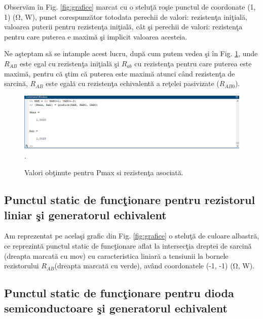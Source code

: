 \documentclass[multi=false, tikz, border=2mm]{article}
\newcommand\tab[1][0.6cm]{\hspace*{#1}}
\begin{document}
Observ\u{a}m \^{i}n Fig. \ref{fig:grafice} marcat cu o stelu\c{t}\u{a} ro\c{s}ie punctul de coordonate (1, 1) (\si{\ohm}, \si{\watt}), punct corespunz\u{a}tor totodata perechii de valori: rezisten\c{t}a ini\c{t}ial\u{a}, valoarea puterii pentru rezisten\c{t}a ini\c{t}ial\u{a}, c\^{a}t \c{s}i perechii de valori: rezisten\c{t}a pentru care puterea e maxim\u{a} \c{s}i implicit valoarea acesteia.

Ne a\c{s}teptam s\u{a} se intample acest lucru, dup\u{a} cum putem vedea \c{s}i \^{i}n Fig. \ref{fig:ValoriPR}, unde $R_{AB}$ este egal cu rezisten\c{t}a ini\c{t}ial\u{a} \c{s}i $R_{ab}$ cu rezisten\c{t}a pentru care puterea este maxim\u{a}, pentru c\u{a} \c{s}tim c\u{a} puterea este maxim\u{a} atunci c\^{a}nd rezisten\c{t}a de sarcin\u{a}, $R_{AB}$ este egal\u{a} cu rezisten\c{t}a echivalent\u{a} a re\c{t}elei pasivizate ($R_{AB0}$).

\begin{figure}[h!b]
	\begin{center}
		\hspace*{-3cm}
		\includegraphics[clip, width=180mm]{ValoriPutereRezistenta}.
	\end{center}
	\caption{Valori ob\c{t}inute pentru Pmax si rezisten\c{t}a asociat\u{a}.}\label{fig:ValoriPR}
\end{figure}

\subsection{Punctul static de func\c{t}ionare pentru rezistorul liniar \c{s}i generatorul echivalent} \label{sssec: PSF1}
	\tab Am reprezentat pe acela\c{s}i grafic din Fig. \ref{fig:grafice} o stelu\c{t}\u{a} de culoare albastr\u{a}, ce reprezint\u{a} punctul static de func\c{t}ionare aflat la intersec\c{t}ia dreptei de sarcin\u{a} (dreapta marcat\u{a} cu mov) cu caracteristica liniar\u{a} a tensiunii la bornele rezistorului $R_{AB}$(dreapta marcat\u{a} cu verde), av\^{a}nd coordonatele (-1, -1) (\si{\ohm}, \si{\watt}).
	
\subsection{Punctul static de func\c{t}ionare pentru dioda semiconductoare \c{s}i generatorul echivalent} \label{sssec: PSF2}
\end{document}
